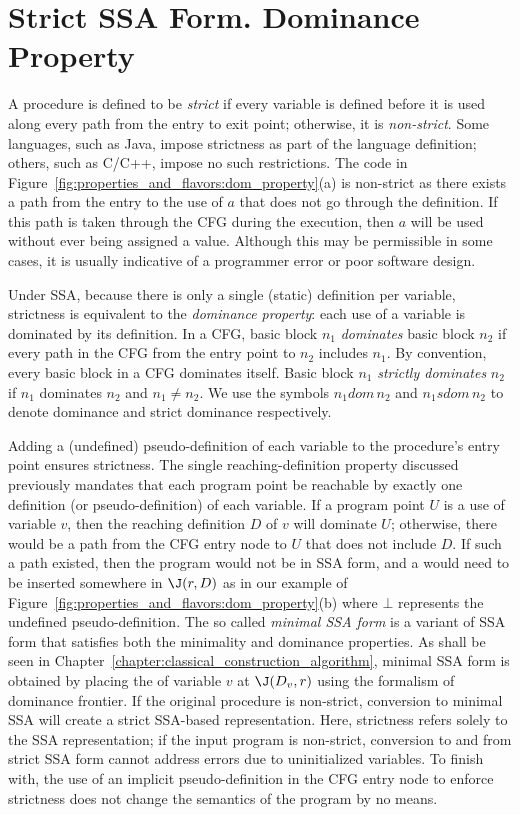 \section{Strict SSA Form. Dominance Property}
\label{sec-prop-dominance}
A procedure is defined to be \emph{strict} if every variable
is defined before it is used along every path from the entry
to exit point; otherwise, it is \emph{non-strict}. 
Some languages, such as Java, impose strictness as part of the language
definition; others, such as C/C++, impose no such restrictions. 
The code in Figure~\ref{fig:properties_and_flavors:dom_property}(a) is non-strict as there exists a path from the entry to the use of $a$ that does not go through the definition. 
If this path is taken through the CFG during the execution, then $a$ will be used without ever
being assigned a value. Although this may be permissible in
some cases, it is usually indicative of a programmer error or poor software design. 

Under SSA, because there is only a single
(static) definition per variable, strictness is equivalent to the
\emph{dominance property}: each use of a variable is dominated by
its definition.
In a CFG, basic block $n_{1}$ \emph{dominates} basic block $n_{2}$
if every path in the CFG from the entry point to $n_{2}$ includes
$n_{1}$. By convention, every basic block in a CFG dominates itself. Basic 
block $n_{1}$ \emph{strictly dominates} $n_{2}$ if $n_{1}$ dominates
$n_{2}$ and $n_{1} \neq n_{2}$. We use the symbols $n_{1} dom\, n_{2}$
and $n_{1} sdom\, n_{2}$ to denote dominance and strict dominance 
respectively.


Adding a (undefined) pseudo-definition of each variable to the procedure's entry
point ensures strictness. 
The single reaching-definition property discussed previously mandates that each
program point be reachable by exactly one definition (or pseudo-definition)
of each variable. If a program point $U$ is a use of variable $v$, then the
reaching definition $D$ of $v$ will dominate $U$; otherwise, there would be a path
from the CFG entry node to $U$ that does not include $D$. If such a  path existed, then the program would not be in SSA form, and a \phifun would need to be inserted somewhere
in $\J(r,D)$ as in our example of Figure~\ref{fig:properties_and_flavors:dom_property}(b) where $\bot$ represents the undefined pseudo-definition. The so called \emph{minimal SSA form} is a variant of SSA form that satisfies both the minimality and dominance properties. As shall be seen in Chapter~\ref{chapter:classical_construction_algorithm}, minimal SSA form is obtained by placing the \phifuns of variable $v$ at $\J(D_v,r)$ using the formalism of dominance frontier.
If the original procedure is non-strict, conversion to minimal SSA
will create a strict SSA-based representation. Here, strictness refers
solely to the SSA representation; if the input program is non-strict,
conversion to and from strict SSA form cannot address errors due
to uninitialized variables. To finish with, the use of an implicit pseudo-definition in the CFG entry node to enforce strictness does not change the semantics of the program by no means.


